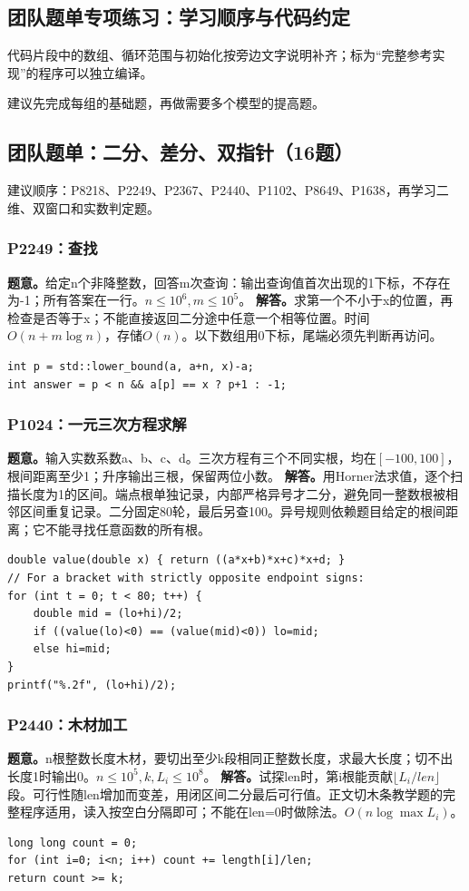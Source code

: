 \subsection{团队题单专项练习：学习顺序与代码约定}
代码片段中的数组、循环范围与初始化按旁边文字说明补齐；标为“完整参考实现”的程序可以独立编译。

建议先完成每组的基础题，再做需要多个模型的提高题。

\subsection{团队题单：二分、差分、双指针（16题）}
建议顺序：P8218、P2249、P2367、P2440、P1102、P8649、P1638，再学习二维、双窗口和实数判定题。

\subsubsection{P2249：查找}
\textbf{题意。}给定n个非降整数，回答m次查询：输出查询值首次出现的1下标，不存在为-1；所有答案在一行。$n\le10^6,m\le10^5$。
\textbf{解答。}求第一个不小于x的位置，再检查是否等于x；不能直接返回二分途中任意一个相等位置。时间$O(n+m\log n)$，存储$O(n)$。以下数组用0下标，尾端必须先判断再访问。
\begin{lstlisting}
int p = std::lower_bound(a, a+n, x)-a;
int answer = p < n && a[p] == x ? p+1 : -1;
\end{lstlisting}

\subsubsection{P1024：一元三次方程求解}
\textbf{题意。}输入实数系数a、b、c、d。三次方程有三个不同实根，均在$[-100,100]$，根间距离至少1；升序输出三根，保留两位小数。
\textbf{解答。}用Horner法求值，逐个扫描长度为1的区间。端点根单独记录，内部严格异号才二分，避免同一整数根被相邻区间重复记录。二分固定80轮，最后另查100。异号规则依赖题目给定的根间距离；它不能寻找任意函数的所有根。
\begin{lstlisting}
double value(double x) { return ((a*x+b)*x+c)*x+d; }
// For a bracket with strictly opposite endpoint signs:
for (int t = 0; t < 80; t++) {
    double mid = (lo+hi)/2;
    if ((value(lo)<0) == (value(mid)<0)) lo=mid;
    else hi=mid;
}
printf("%.2f", (lo+hi)/2);
\end{lstlisting}

\subsubsection{P2440：木材加工}
\textbf{题意。}n根整数长度木材，要切出至少k段相同正整数长度，求最大长度；切不出长度1时输出0。$n\le10^5,k,L_i\le10^8$。
\textbf{解答。}试探len时，第i根能贡献$\lfloor L_i/len\rfloor$段。可行性随len增加而变差，用闭区间二分最后可行值。正文切木条教学题的完整程序适用，读入按空白分隔即可；不能在len=0时做除法。$O(n\log\max L_i)$。
\begin{lstlisting}
long long count = 0;
for (int i=0; i<n; i++) count += length[i]/len;
return count >= k;
\end{lstlisting}

